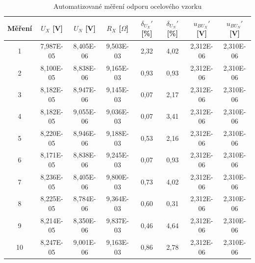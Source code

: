 \documentclass[a4paper, czech]{article}
\begin{document}
\begin{table}[H]
    \centering
    \caption{Automatizované měření odporu ocelového vzorku}
    \begin{tabular}{>{\columncolor{lightgray!50}}c>{\columncolor{lightgray!50}}c>{\columncolor{lightgray!50}}c>{\columncolor{lightgray!50}}ccccc}
        \hline
        \rowcolor{lightgray} Měření & $U_X$ {[}V{]} & $U_N$ {[}V{]} & $R_X$ {[}$\Omega${]} & $\delta_{U_X}'$ {[}\%{]} & $\delta_{U_N}'$ {[}\%{]} & $u_{BU_X}'$ {[}V{]} & $u_{BU_N}'$ {[}V{]} \\
        \hline
        1  & 7,987E-05 & 8,405E-06 & 9,503E-03 & 2,32 & 4,02 & 2,312E-06 & 2,310E-06 \\
        2  & 8,100E-05 & 8,838E-06 & 9,165E-03 & 0,93 & 0,93 & 2,312E-06 & 2,310E-06 \\
        3  & 8,182E-05 & 8,947E-06 & 9,145E-03 & 0,07 & 2,17 & 2,312E-06 & 2,310E-06 \\
        4  & 8,182E-05 & 9,055E-06 & 9,036E-03 & 0,07 & 3,41 & 2,312E-06 & 2,310E-06 \\
        5  & 8,220E-05 & 8,946E-06 & 9,188E-03 & 0,53 & 2,16 & 2,312E-06 & 2,310E-06 \\
        6  & 8,171E-05 & 8,838E-06 & 9,245E-03 & 0,07 & 0,93 & 2,312E-06 & 2,310E-06 \\
        7  & 8,236E-05 & 8,405E-06 & 9,800E-03 & 0,73 & 4,02 & 2,312E-06 & 2,310E-06 \\
        8  & 8,225E-05 & 8,784E-06 & 9,364E-03 & 0,60 & 0,31 & 2,312E-06 & 2,310E-06 \\
        9  & 8,214E-05 & 8,350E-06 & 9,837E-03 & 0,46 & 4,64 & 2,312E-06 & 2,310E-06 \\
        10 & 8,247E-05 & 9,001E-06 & 9,163E-03 & 0,86 & 2,78 & 2,312E-06 & 2,310E-06 \\
        \hline
    \end{tabular}


\end{table}
\end{document}
